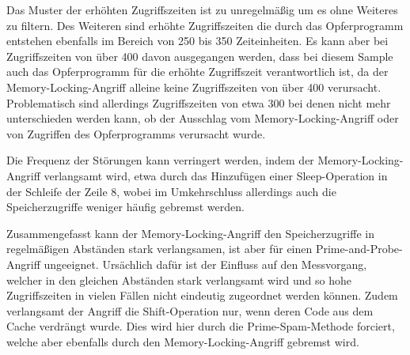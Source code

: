 Das Muster der erhöhten Zugriffszeiten ist zu unregelmäßig um es ohne Weiteres zu filtern.
Des Weiteren sind erhöhte Zugriffszeiten die durch das Opferprogramm entstehen ebenfalls im Bereich von 250 bis 350 Zeiteinheiten.
Es kann aber bei Zugriffszeiten von über 400 davon ausgegangen werden, dass bei diesem Sample auch das Opferprogramm für die erhöhte Zugriffszeit verantwortlich ist, da der Memory-Locking-Angriff alleine keine Zugriffszeiten von über 400 verursacht.
Problematisch sind allerdings Zugriffszeiten von etwa 300 bei denen nicht mehr unterschieden werden kann, ob der Ausschlag vom Memory-Locking-Angriff oder von Zugriffen des Opferprogramms verursacht wurde.

Die Frequenz der Störungen kann verringert werden, indem der Memory-Locking-Angriff verlangsamt wird, etwa durch das Hinzufügen einer Sleep-Operation in der Schleife der Zeile 8, wobei im Umkehrschluss allerdings auch die Speicherzugriffe weniger häufig gebremst werden.

Zusammengefasst kann der Memory-Locking-Angriff den Speicherzugriffe in regelmäßigen Abständen stark verlangsamen, ist aber für einen Prime-and-Probe-Angriff ungeeignet.
Ursächlich dafür ist der Einfluss auf den Messvorgang, welcher in den gleichen Abständen stark verlangsamt wird und so hohe Zugriffszeiten in vielen Fällen nicht eindeutig zugeordnet werden können.
Zudem verlangsamt der Angriff die Shift-Operation nur, wenn deren Code aus dem Cache verdrängt wurde.
Dies wird hier durch die Prime-Spam-Methode forciert, welche aber ebenfalls durch den Memory-Locking-Angriff gebremst wird.







